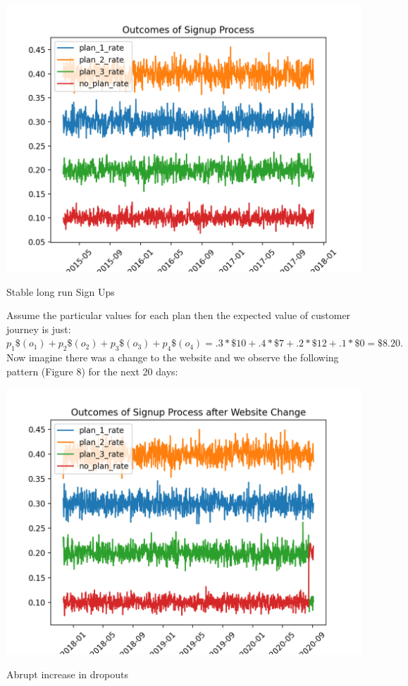 \documentclass{tufte-handout}
\begin{document}
\begin{marginfigure}
  \includegraphics[width=\linewidth]{../Expectation/Plots/outcomes_of_signup.png}
  \caption{Stable long run Sign Ups }
\end{marginfigure}

\noindent Assume the particular values for each plan then the expected value of customer journey is just: $ p_{1}\$(o_{1}) + p_{2}\$(o_{2}) + p_{3}\$(o_{3}) + p_{4}\$(o_{4})  = .3*\$10 + .4*\$7  + .2*\$12 + .1*\$0 = \$8.20.$ Now imagine there was a change to the website and we observe the following pattern (Figure 8) for the next 20 days:
\linebreak

\begin{marginfigure}
  \includegraphics[width=\linewidth]{../Expectation/Plots/outcomes_of_signup_post.png}
  \caption{Abrupt increase in dropouts}
\end{marginfigure}
\end{document}
